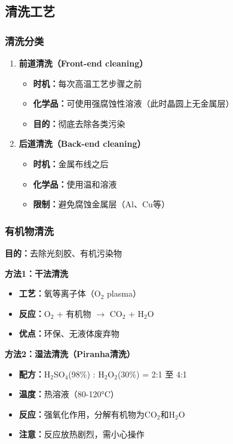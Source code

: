 \documentclass[UTF8,12pt,a4paper]{ctexart}
\begin{document}
\subsection{清洗工艺}

\subsubsection{清洗分类}

\begin{enumerate}
    \item \textbf{前道清洗（Front-end cleaning）}
    \begin{itemize}
        \item \textbf{时机：}每次高温工艺步骤之前
        \item \textbf{化学品：}可使用强腐蚀性溶液（此时晶圆上无金属层）
        \item \textbf{目的：}彻底去除各类污染
    \end{itemize}
    
    \item \textbf{后道清洗（Back-end cleaning）}
    \begin{itemize}
        \item \textbf{时机：}金属布线之后
        \item \textbf{化学品：}使用温和溶液
        \item \textbf{限制：}避免腐蚀金属层（Al、Cu等）
    \end{itemize}
\end{enumerate}

\subsubsection{有机物清洗}

\textbf{目的：}去除光刻胶、有机污染物

\textbf{方法1：干法清洗}
\begin{itemize}
    \item \textbf{工艺：}氧等离子体（O$_2$ plasma）
    \item \textbf{反应：}O$_2$ + 有机物 $\rightarrow$ CO$_2$ + H$_2$O
    \item \textbf{优点：}环保、无液体废弃物
\end{itemize}

\textbf{方法2：湿法清洗（Piranha清洗）}
\begin{itemize}
    \item \textbf{配方：}H$_2$SO$_4$(98\%) : H$_2$O$_2$(30\%) = 2:1 至 4:1
    \item \textbf{温度：}热溶液（80-120°C）
    \item \textbf{反应：}强氧化作用，分解有机物为CO$_2$和H$_2$O
    \item \textbf{注意：}反应放热剧烈，需小心操作
\end{itemize}
\end{document}

